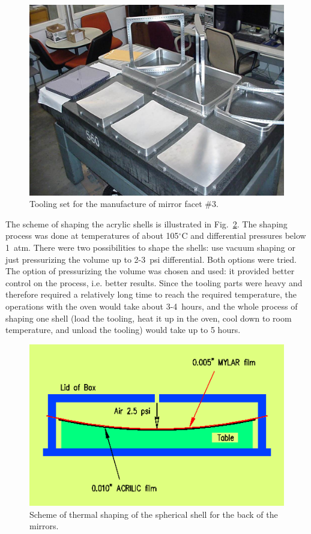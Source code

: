 \begin{figure}[ht]
    \centering
    \includegraphics[width=1.0\linewidth]{images/Tool_on_tbl.jpg}
    \caption{Tooling set for the manufacture of mirror facet \#3.}
    \label{fig:Tool_on_tbl}
\end{figure}

The scheme of shaping the acrylic shells is illustrated in  Fig.~\ref{fig:Shaping_new}. 
The shaping process was
done at temperatures of about 105$^\circ$C and differential pressures below 1~atm. There were two possibilities to
shape the shells: use vacuum shaping or just pressurizing the volume up to 2-3~psi differential. Both options were tried. The option of pressurizing the volume was chosen and used: it provided better control on the process, i.e. better results. Since the tooling parts
were heavy and therefore required a relatively long time to reach the required temperature, the operations with the
oven would take about 3-4~hours, and the whole process of shaping one shell (load the tooling, heat it up in the oven,
cool down to room temperature, and unload the tooling) would take up to 5 hours.

\begin{figure}[ht]
    \centering
    \includegraphics[width=1.0\linewidth]{images/Shaping_new.png}
    \caption{Scheme of thermal shaping of the spherical shell for the back of the mirrors.}
    \label{fig:Shaping_new}
\end{figure}

